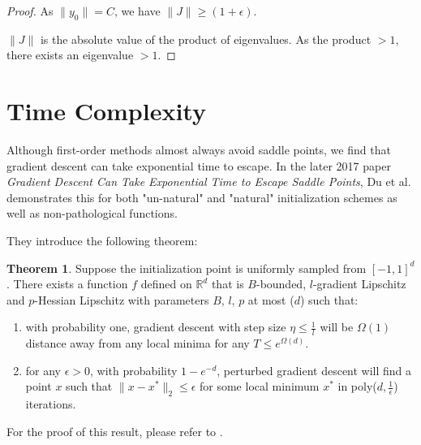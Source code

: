 \documentclass[twoside]{article}
\theoremstyle{definition}
\newtheorem{thm}{Theorem}[section]
\theoremstyle{definition}
\theoremstyle{remark}
\begin{document}
\begin{proof}
As $\| y_0 \| = C$, we have $ \| J \| \geq (1 + \epsilon).$

$\| J \|$ is the absolute value of the product of eigenvalues. As the product $> 1$, there exists an eigenvalue $> 1$.

\end{proof}

\section{Time Complexity}

Although first-order methods almost always avoid saddle points, we find that gradient descent can take exponential time to escape. In the later 2017 paper \textit{Gradient Descent Can Take Exponential Time to Escape Saddle Points}, Du et al. demonstrates this for both "un-natural" and "natural" initialization schemes as well as non-pathological functions.

They introduce the following theorem:
\begin{thm}
Suppose the initialization point is uniformly sampled from $[-1,1]^d$. There exists a function $f$ defined on $\mathbb{R}^{d}$ that is $B$-bounded, $l$-gradient Lipschitz and $p$-Hessian Lipschitz with parameters $B$, $l$, $p$ at most ($d$) such that:

\begin{enumerate}
\item with probability one, gradient descent with step size $\eta \leq \frac{1}{l}$ will be $\Omega(1)$ distance away from any local minima for any $T \leq e^{\Omega(d)}$.
\item for any $\epsilon > 0$, with probability $1 - e^{-d}$, perturbed gradient descent will find a point $x$ such that $\| x - x^* \|_2 \leq \epsilon$ for some local minimum $x^*$ in poly($d, \frac{1}{\epsilon}$) iterations.
\end{enumerate}

\end{thm}

For the proof of this result, please refer to \cite[Theorem~4.1]{paper2}.

\nocite{*}


\end{document}
